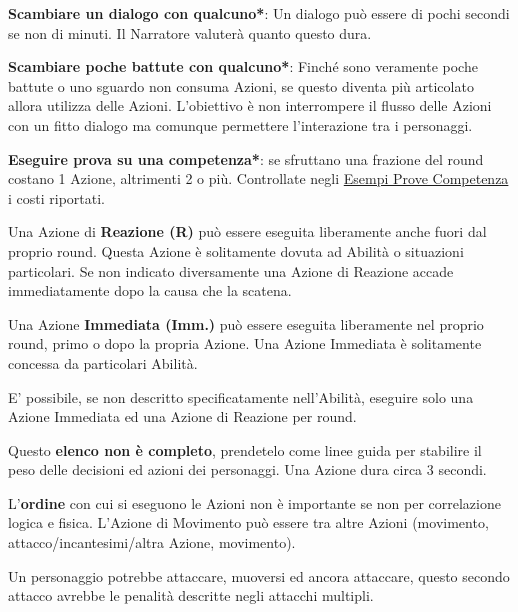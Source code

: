 \begin{multicols}{2}
\textbf{Scambiare un dialogo con qualcuno*}: Un dialogo può essere di pochi secondi se non di minuti. Il Narratore valuterà quanto questo dura.

\textbf{Scambiare poche battute con qualcuno*}: Finché sono veramente poche battute o uno sguardo non consuma Azioni, se questo diventa più articolato allora utilizza delle Azioni. L'obiettivo è non interrompere il flusso delle Azioni con un fitto dialogo ma comunque permettere l'interazione tra i personaggi.

\textbf{Eseguire prova su una competenza*}: se sfruttano una frazione del round costano 1 Azione, altrimenti 2 o più. Controllate negli \hyperlink{esempiprovecompetenze}{Esempi Prove Competenza} i costi riportati.

Una Azione di \textbf{Reazione (R)} può essere eseguita liberamente anche fuori dal proprio round. Questa Azione è solitamente dovuta ad Abilità o situazioni particolari. Se non indicato diversamente una Azione di Reazione accade immediatamente dopo la causa che la scatena.

Una Azione \textbf{Immediata (Imm.)} può essere eseguita liberamente nel proprio round, primo o dopo la propria Azione. Una Azione Immediata è solitamente concessa da particolari Abilità.

E' possibile, se non descritto specificatamente nell'Abilità, eseguire solo una Azione Immediata ed una Azione di Reazione per round.

\smallskip

Questo \textbf{elenco non è completo}, prendetelo come linee guida per stabilire il peso delle decisioni ed azioni dei personaggi. Una Azione dura circa 3 secondi.

L'\textbf{ordine} con cui si eseguono le Azioni non è importante se non per correlazione logica e fisica. L'Azione di Movimento può essere tra altre Azioni (movimento, attacco/incantesimi/altra Azione, movimento).

Un personaggio potrebbe attaccare, muoversi ed ancora attaccare, questo secondo attacco avrebbe le penalità descritte negli attacchi multipli.

\end{multicols}

\vfill


